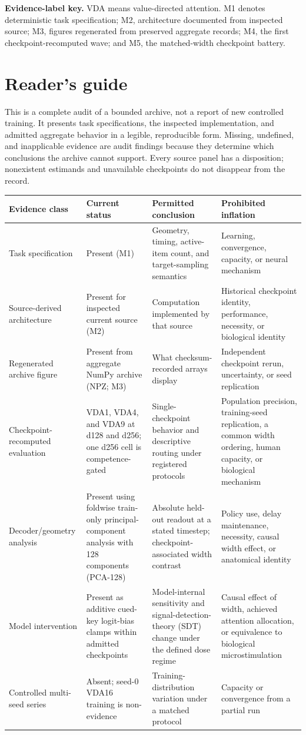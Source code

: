 \documentclass[11pt,a4paper]{article}
\begin{document}
\noindent\textbf{Evidence-label key.} VDA means value-directed attention. M1 denotes deterministic task specification; M2, architecture documented from inspected source; M3, figures regenerated from preserved aggregate records; M4, the first checkpoint-recomputed wave; and M5, the matched-width checkpoint battery.

\section*{Reader's guide}
This is a complete audit of a bounded archive, not a report of new controlled training. It presents task specifications, the inspected implementation, and admitted aggregate behavior in a legible, reproducible form. Missing, undefined, and inapplicable evidence are audit findings because they determine which conclusions the archive cannot support. Every source panel has a disposition; nonexistent estimands and unavailable checkpoints do not disappear from the record.

\begingroup\small
\begin{tabularx}{\textwidth}{@{}p{3.5cm}p{2.7cm}Y Y@{}}
\toprule
\textbf{Evidence class} & \textbf{Current status} & \textbf{Permitted conclusion} & \textbf{Prohibited inflation}\\
\midrule
Task specification & Present (M1) & Geometry, timing, active-item count, and target-sampling semantics & Learning, convergence, capacity, or neural mechanism\\
Source-derived architecture & Present for inspected current source (M2) & Computation implemented by that source & Historical checkpoint identity, performance, necessity, or biological identity\\
Regenerated archive figure & Present from aggregate NumPy archive (NPZ; M3) & What checksum-recorded arrays display & Independent checkpoint rerun, uncertainty, or seed replication\\
Checkpoint-recomputed evaluation & VDA1, VDA4, and VDA9 at d128 and d256; one d256 cell is competence-gated & Single-checkpoint behavior and descriptive routing under registered protocols & Population precision, training-seed replication, a common width ordering, human capacity, or biological mechanism\\
Decoder/geometry analysis & Present using foldwise train-only principal-component analysis with 128 components (PCA-128) & Absolute held-out readout at a stated timestep; checkpoint-associated width contrast & Policy use, delay maintenance, necessity, causal width effect, or anatomical identity\\
Model intervention & Present as additive cued-key logit-bias clamps within admitted checkpoints & Model-internal sensitivity and signal-detection-theory (SDT) change under the defined dose regime & Causal effect of width, achieved attention allocation, or equivalence to biological microstimulation\\
Controlled multi-seed series & Absent; seed-0 VDA16 training is non-evidence & Training-distribution variation under a matched protocol & Capacity or convergence from a partial run\\
\bottomrule
\end{tabularx}
\endgroup
\end{document}
